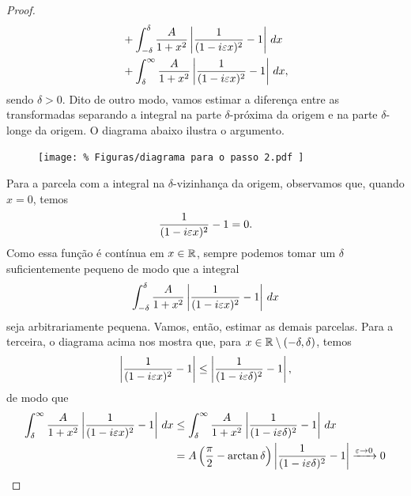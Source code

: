 \begin{proof}
\begin{align*}
                &+ \int_{-\delta}^{\delta} \frac{A}{1+ x^2}\left| \frac{1}{(1-i\varepsilon x)^2} - 1 \right| \, dx \\
                &+ \int_{\delta}^{\infty} \frac{A}{1+ x^2}\left| \frac{1}{(1-i\varepsilon x)^2} - 1 \right| \, dx,
            \end{align*}
            sendo $\delta > 0$. Dito de outro modo, vamos estimar a diferença entre as transformadas
            separando a integral na parte $\delta$-próxima da origem e na parte $\delta$-longe da origem.
            O diagrama abaixo ilustra o argumento.
            \begin{figure}[H]\centering
                \texttt{[image: \%
                    Figuras/diagrama para o passo 2.pdf
                ]}
            \end{figure}
            Para a parcela com a integral na $\delta$-vizinhança da origem, observamos que, quando $x = 0$,
            temos
            \begin{equation*}
                \frac{1}{(1-i\varepsilon x)^2} - 1 = 0.
            \end{equation*}
            Como essa função é contínua em $x\in\mathbb{R}$, sempre podemos tomar um $\delta$ suficientemente pequeno
            de modo que a integral
            \begin{equation*}
                \int_{-\delta}^{\delta} \frac{A}{1+ x^2}\left| \frac{1}{(1-i\varepsilon x)^2} - 1 \right| \, dx
            \end{equation*}
            seja arbitrariamente pequena. Vamos, então, estimar as demais parcelas. Para a terceira, o diagrama
            acima nos mostra que, para $x\in\mathbb{R}\setminus (-\delta, \delta)$, temos
            \begin{align*}
                \left| \frac{1}{(1-i\varepsilon x)^2} - 1 \right| \leq \left| \frac{1}{(1-i\varepsilon\delta)^2} - 1 \right|,
            \end{align*}
            de modo que
            \begin{align*}
                \int_{\delta}^{\infty} \frac{A}{1+ x^2}\left| \frac{1}{(1-i\e x)^2} - 1 \right| \, dx
                &\leq \int_{\delta}^{\infty} \frac{A}{1+ x^2}\left| \frac{1}{(1-i\e\delta)^2} - 1 \right| \, dx \\
                &=  A\left( \frac{\pi}{2} - \arctan\delta \right) \left| \frac{1}{(1-i\e\delta)^2} - 1 \right| 
                \xrightarrow{\e\to 0} 0

\end{align*}
\end{proof}
